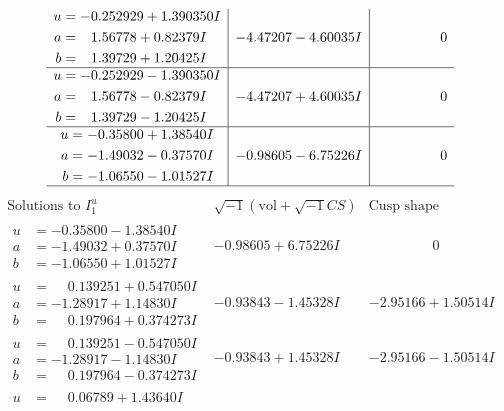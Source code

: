\documentclass[1p]{elsarticle_modified}
\theoremstyle{definition}
\newcommand{\I}{\sqrt{-1}}
\begin{document}
$$\begin{array}{c|c|c}
\begin{aligned}
u &= -0.252929 + 1.390350 I \\
a &= \phantom{-}1.56778 + 0.82379 I \\
b &= \phantom{-}1.39729 + 1.20425 I\end{aligned}
 & -4.47207 - 4.60035 I & \phantom{-0.000000 } 0 \\ \hline\begin{aligned}
u &= -0.252929 - 1.390350 I \\
a &= \phantom{-}1.56778 - 0.82379 I \\
b &= \phantom{-}1.39729 - 1.20425 I\end{aligned}
 & -4.47207 + 4.60035 I & \phantom{-0.000000 } 0 \\ \hline\begin{aligned}
u &= -0.35800 + 1.38540 I \\
a &= -1.49032 - 0.37570 I \\
b &= -1.06550 - 1.01527 I\end{aligned}
 & -0.98605 - 6.75226 I & \phantom{-0.000000 } 0\\
 \hline 
 \end{array}$$\newpage$$\begin{array}{c|c|c}  
\text{Solutions to }I^u_{1}& \I (\text{vol} + \sqrt{-1}CS) & \text{Cusp shape}\\
 \hline 
\begin{aligned}
u &= -0.35800 - 1.38540 I \\
a &= -1.49032 + 0.37570 I \\
b &= -1.06550 + 1.01527 I\end{aligned}
 & -0.98605 + 6.75226 I & \phantom{-0.000000 } 0 \\ \hline\begin{aligned}
u &= \phantom{-}0.139251 + 0.547050 I \\
a &= -1.28917 + 1.14830 I \\
b &= \phantom{-}0.197964 + 0.374273 I\end{aligned}
 & -0.93843 - 1.45328 I & -2.95166 + 1.50514 I \\ \hline\begin{aligned}
u &= \phantom{-}0.139251 - 0.547050 I \\
a &= -1.28917 - 1.14830 I \\
b &= \phantom{-}0.197964 - 0.374273 I\end{aligned}
 & -0.93843 + 1.45328 I & -2.95166 - 1.50514 I \\ \hline\begin{aligned}
u &= \phantom{-}0.06789 + 1.43640 I \\

\end{aligned}
\end{array}$$
\end{document}
